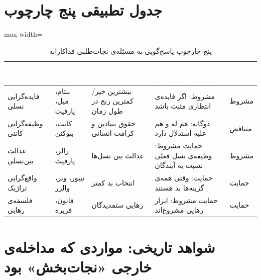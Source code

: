 \section{جدول تطبیقی پنج چارچوب}
\label{sec:ch15-frameworks-table}


\begin{table}[htbp]
\centering
\caption{پنج چارچوب پاسخ‌گویی به مسئله‌ی نجات‌طلبی فداکارانه}
\label{tab:ch15-frameworks}
\begin{adjustbox}{max width=\linewidth}
\begin{tabularx}{\linewidth}{
    >{\raggedleft\arraybackslash}p{2.5cm}
    >{\raggedleft\arraybackslash}p{2.5cm}
    >{\raggedleft\arraybackslash}p{3cm}
    >{\raggedleft\arraybackslash}X
    >{\centering\arraybackslash}p{1.5cm}
}
\toprule
\rowcolor{PrimaryDeep}
\textcolor{white}{\textbf{چارچوب}} &
\textcolor{white}{\textbf{متفکر اصلی}} &
\textcolor{white}{\textbf{معیار ارزیابی}} &
\textcolor{white}{\textbf{حکم درباره‌ی نجات‌طلبی فداکارانه}} &
\textcolor{white}{\textbf{موضع}} \\
\midrule
فایده‌گرایی نسلی & بنتام، میل، پارفیت & بیشترین خیر/کمترین رنج در طول زمان & مشروط: اگر فایده‌ی انتظاری مثبت باشد & مشروط \\
\rowcolor{NeutralLight}
وظیفه‌گرایی کانتی & کانت، بیوکنن & حقوق بنیادین و کرامت انسانی & دوگانه: هم له و هم علیه استدلال دارد & متناقض \\
عدالت بین‌نسلی & رالز، پارفیت & عدالت بین نسل‌ها & حمایت مشروط: وظیفه‌ی نسل فعلی نسبت به آیندگان & مشروط \\
\rowcolor{NeutralLight}
واقع‌گرایی تراژیک & نیبور، وبر، والزر & انتخاب بد کمتر & حمایت: وقتی همه‌ی گزینه‌ها بد هستند & حمایت \\
فلسفه‌ی رهایی & فانون، فریره & رهایی ستمدیدگان & حمایت مشروط: ابزار رهایی مشروع‌اند & حمایت \\
\bottomrule
\end{tabularx}
\end{adjustbox}
\end{table}


\section{شواهد تاریخی: مواردی که مداخله‌ی خارجی «نجات‌بخش» بود}
\label{sec:ch15-historical-evidence}

